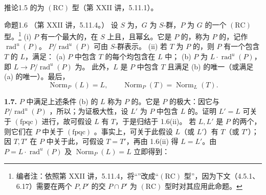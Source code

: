 \begin{SGAresult}{推论}{1.5}
的为 $(\mathrm{RC})$ 型（第 XXII 讲，5.11.1）。
\end{SGAresult}
\begin{SGAresult}{命题}{1.6}
（第 XXII 讲，5.11.4。）
设 $S$ 为，$G$ 为 $S$-群，$P$ 为 $G$ 的一个 $(\mathrm{RC})$ 型。\footnote{编者注：依照第 XXII 讲，5.11.4，将“”改成“$(\mathrm{RC})$ 型”，因为下文（4.5.1、6.17）需要在两个 $P,P'$ 的交 $P\cap P'$ 为 $(\mathrm{RC})$ 型时对其应用此命题。}
(i) $P$ 有一个最大的，在 $S$ 上且，且幂幺。它是 $P$ 的，称为 $P$ 的，记作 $\operatorname{rad}^{u}(P)$。 $P/\operatorname{rad}^{u}(P)$ 可由 $S$-群表示。
(ii) 若 $T$ 为 $P$ 的，则 $P$ 有一个包含 $T$ 的 $L$，满足：
(a) $P$ 中包含 $T$ 的每个均包含在 $L$ 中；
(b) $P$ 为 $L\cdot\operatorname{rad}^{u}(P)$，即 $L\to P/\operatorname{rad}^{u}(P)$ 为。
此外，$L$ 是 $P$ 中包含 $T$ 且满足 (b) 的唯一（或满足 (a) 的唯一）。最后，
\[\operatorname{Norm}_P(L)=L,\qquad\operatorname{Norm}_P(T)=\operatorname{Norm}_L(T).\]
\end{SGAresult}
\textbf{1.7.} $P$ 中满足上述条件 (b) 的 $L$ 称为 $P$ 的。它是 $P$ 的极大：因它与 $P/\operatorname{rad}^{u}(P)$ ，所以；为证极大性，设 $L'$ 为 $P$ 中包含 $L$ 的。证明 $L'=L$ 可关于 $(\mathrm{fpqc})$ 进行，故可假设 $L$ 有 $T$，于是归结于 1.6(ii)。
若 $L,L'$ 是 $P$ 的两个，则它们在 $P$ 中关于 $(\mathrm{fpqc})$ 。事实上，可关于此假设 $L$（或 $L'$）有 $T$（或 $T'$）；因 $T,T'$ 在 $P$ 中关于此，可假设 $T=T'$，再由 1.6(ii) 得 $L=L'$。由 $P=L\cdot\operatorname{rad}^{u}(P)$ 及 $\operatorname{Norm}_P(L)=L$ 立即得到：
